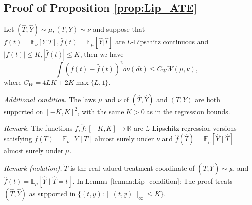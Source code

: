 \subsection{Proof of Proposition \ref{prop:Lip_ATE}}
\begin{lemma}\label{lemma:Lip_condition}
Let $ (\hat{T} ,\hat{Y}) \sim \mu ,( T,Y) \sim \nu $ and suppose that $ f( t) =\mathbb{E}_{\nu }[ Y|T] ,\hat{f}( t) =\mathbb{E}_{\mu }[\hat{Y} |\hat{T}]$ are $ L$-Lipschitz continuous and $|f(t)|\leqslant K, |\hat{f}(t)| \leqslant K$, then we have 
\begin{equation*}
\int ( f( t) -\hat{f}( t))^{2} d\nu ( dt) \leqslant C_{W} W( \mu ,\nu ) ,
\end{equation*}
where $ C_{W} =4LK+2K\max\{L,1\}$.

\emph{Additional condition.} The laws $\mu$ and $\nu$ of $(\hat T,\hat Y)$ and $(T,Y)$ are both supported on $[-K,K]^2$, with the same $K>0$ as in the regression bounds.
\end{lemma}

\noindent\textit{Remark.} The functions $f,\hat{f}:[-K,K]\rightarrow\mathbb{R}$ are $L$-Lipschitz regression versions satisfying $f(T)=\mathbb{E}_{\nu}[Y\mid T]$ almost surely under $\nu$ and $\hat{f}(\hat{T})=\mathbb{E}_{\mu}[\hat{Y}\mid\hat{T}]$ almost surely under $\mu$.

\noindent\textit{Remark (notation).} $\hat{T}$ is the real-valued treatment coordinate of $(\hat{T},\hat{Y})\sim\mu$, and $\hat{f}(t)=\mathbb{E}_{\mu}[\hat{Y}\mid\hat{T}=t]$. In Lemma~\ref{lemma:Lip_condition}: The proof treats $(\hat{T},\hat{Y})$ as supported in $\{(t,y):\|(t,y)\|_\infty\leqslant K\}$.



